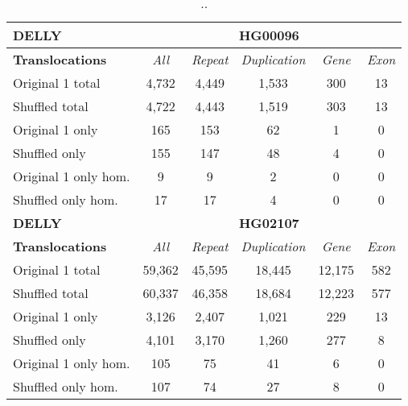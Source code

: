 \begin{table}[htb]
\caption{ .. }
\begin{center}
\begin{tabular}{|l|c||c|c|c|c|}
\hline
{\bf DELLY} & \multicolumn{5}{|c|}{\bf HG00096} \\
\hline
\cline{2-6}
{\bf Translocations} & {\it All} & {\it Repeat} & {\it Duplication} & {\it Gene} & {\it Exon} \\
\hline
Original 1 total & 4,732 & 4,449 & 1,533 & 300 & 13\\ 
\hline
Shuffled total & 4,722 & 4,443 & 1,519 & 303 & 13\\ 
\hline
Original 1 only & 165 & 153 & 62 & 1 & 0\\ 
\hline
Shuffled only & 155 & 147 & 48 & 4 & 0\\ 
\hline
Original 1 only hom. & 9 & 9 & 2 & 0 & 0\\ 
\hline
Shuffled only hom. & 17 & 17 & 4 & 0 & 0\\ 
\hline
\hline
{\bf DELLY} & \multicolumn{5}{|c|}{\bf HG02107} \\
\hline
\cline{2-6}
{\bf Translocations} & {\it All} & {\it Repeat} & {\it Duplication} & {\it Gene} & {\it Exon} \\
\hline
Original 1 total & 59,362 & 45,595 & 18,445 & 12,175 & 582\\ 
\hline
Shuffled total & 60,337 & 46,358 & 18,684 & 12,223 & 577\\ 
\hline
Original 1 only & 3,126 & 2,407 & 1,021 & 229 & 13\\ 
\hline
Shuffled only & 4,101 & 3,170 & 1,260 & 277 & 8\\ 
\hline
Original 1 only hom. & 105 & 75 & 41 & 6 & 0\\ 
\hline
Shuffled only hom. & 107 & 74 & 27 & 8 & 0\\ 
\hline
\end{tabular}
\end{center}
\label{tab:orig-vs-shuf-delly-trans}
\end{table}

